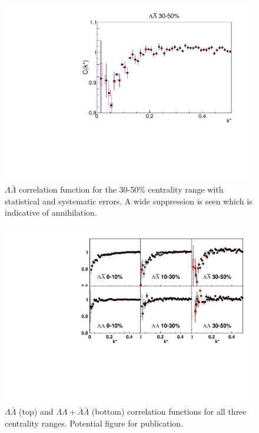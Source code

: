 \begin{figure}[hbtp]
\includegraphics[width=36pc]{Figures/CFs/2016-8-30-CFLamALam3050CombinedSystematicsMaximum.pdf}
\caption[$\Lambda\bar{\Lambda}$ correlation function for the 30-50\% centrality range]{$\Lambda\bar{\Lambda}$ correlation function for the 30-50\% centrality range with statistical and systematic errors.  
A wide suppression is seen which is indicative of annihilation.}
\label{fig:CFLamALam3050}
\end{figure}

\begin{figure}[hbtp]
\includegraphics[width=36pc]{Figures/CFs/2016-08-30-AllCFsWithSysErrorsNoFit.pdf}
\caption[All $\Lambda\Lambda+\bar{\Lambda}\bar{\Lambda}$ and $\Lambda\bar{\Lambda}$ correlation functions]{$\Lambda\bar{\Lambda}$ (top) and $\Lambda\Lambda+\bar{\Lambda}\bar{\Lambda}$ (bottom) correlation functions for all three centrality ranges.  
Potential figure for publication.}
\label{fig:CFAllOnOnePlot}
\end{figure}



